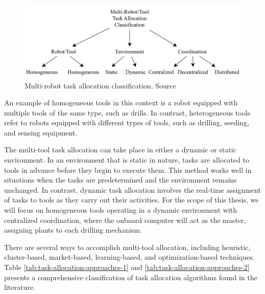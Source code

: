 \begin{figure}[bth]
    \centering
    \includegraphics[width=0.9\linewidth]{gfx/ch01/task-allocation-classification.png}
    \caption{Multi-robot task allocation classification. Source \cite{10.1145/3700591}}
    \label{fig:task-allocation-classification}
\end{figure}

An example of homogeneous tools in this context is a robot equipped with multiple tools of the same type, such as drills. In contrast, heterogeneous tools refer to robots equipped with different types of tools, such as drilling, seeding, and sensing equipment.

The multi-tool task allocation can take place in either a dynamic or static environment. In an environment that is static in nature, tasks are allocated to tools in advance before they begin to execute them. This method works well in situations when the tasks are predetermined and the environment remains unchanged. In contrast, dynamic task allocation involves the real-time assignment of tasks to tools as they carry out their activities. For the scope of this thesis, we will focus on homogeneous tools operating in a dynamic environment with centralized coordination, where the onboard computer will act as the master, assigning plants to each drilling mechanism.

There are several ways to accomplish multi-tool allocation, including heuristic, cluster-based, market-based, learning-based, and optimization-based techniques. Table \ref{tab:task-allocation-approaches-1} and \ref{tab:task-allocation-approaches-2} presents a comprehensive classification of task allocation algorithms found in the literature.

